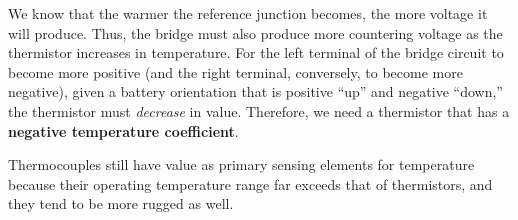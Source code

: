 We know that the warmer the reference junction becomes, the more voltage it will produce.  Thus, the bridge must also produce more countering voltage as the thermistor increases in temperature.  For the left terminal of the bridge circuit to become more positive (and the right terminal, conversely, to become more negative), given a battery orientation that is positive ``up'' and negative ``down,'' the thermistor must {\it decrease} in value.  Therefore, we need a thermistor that has a {\bf negative temperature coefficient}.

\vskip 10pt

Thermocouples still have value as primary sensing elements for temperature because their operating temperature range far exceeds that of thermistors, and they tend to be more rugged as well.












